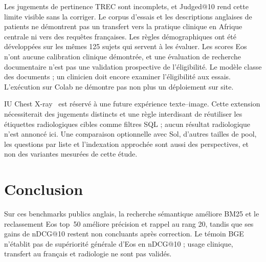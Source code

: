 \documentclass{article}
\begin{document}
Les jugements de pertinence TREC sont incomplets, et Judged@10 rend cette limite visible sans la corriger. Le corpus d'essais et les descriptions anglaises de patients ne démontrent pas un transfert vers la pratique clinique en Afrique centrale ni vers des requêtes françaises. Les règles démographiques ont été développées sur les mêmes 125 sujets qui servent à les évaluer. Les scores Eos n'ont aucune calibration clinique démontrée, et une évaluation de recherche documentaire n'est pas une validation prospective de l'éligibilité. Le modèle classe des documents ; un clinicien doit encore examiner l'éligibilité aux essais. L'exécution sur Colab ne démontre pas non plus un déploiement sur site.

IU Chest X-ray~\citep{demnerfushman2016iuxray} est réservé à une future expérience texte--image. Cette extension nécessiterait des jugements distincts et une règle interdisant de réutiliser les étiquettes radiologiques cibles comme filtres SQL ; aucun résultat radiologique n'est annoncé ici. Une comparaison optionnelle avec Sol, d'autres tailles de pool, les questions par liste et l'indexation approchée sont aussi des perspectives, et non des variantes mesurées de cette étude.

\section{Conclusion}

Sur ces benchmarks publics anglais, la recherche sémantique améliore BM25 et le reclassement Eos top~50 améliore précision et rappel au rang 20, tandis que ses gains de nDCG@10 restent non concluants après correction. Le témoin BGE n'établit pas de supériorité générale d'Eos en nDCG@10 ; usage clinique, transfert au français et radiologie ne sont pas validés.

\small


\end{document}
